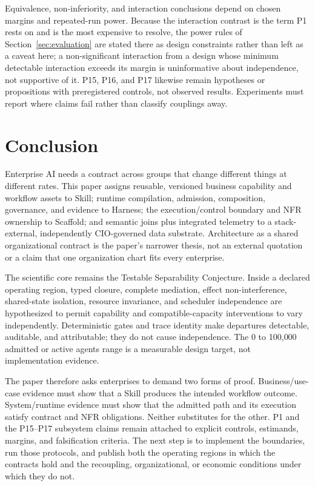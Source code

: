 Equivalence, non-inferiority, and interaction conclusions depend on chosen margins and repeated-run power. Because the interaction contrast is the term P1 rests on and is the most expensive to resolve, the power rules of Section~\ref{sec:evaluation} are stated there as design constraints rather than left as a caveat here; a non-significant interaction from a design whose minimum detectable interaction exceeds its margin is uninformative about independence, not supportive of it. P15, P16, and P17 likewise remain hypotheses or propositions with preregistered controls, not observed results. Experiments must report where claims fail rather than classify couplings away.

\section{Conclusion}
\label{sec:conclusion}

Enterprise AI needs a contract across groups that change different things at different rates. This paper assigns reusable, versioned business capability and workflow assets to Skill; runtime compilation, admission, composition, governance, and evidence to Harness; the execution/control boundary and NFR ownership to Scaffold; and semantic joins plus integrated telemetry to a stack-external, independently CIO-governed data substrate. Architecture as a shared organizational contract is the paper's narrower thesis, not an external quotation or a claim that one organization chart fits every enterprise.

The scientific core remains the Testable Separability Conjecture. Inside a declared operating region, typed closure, complete mediation, effect non-interference, shared-state isolation, resource invariance, and scheduler independence are hypothesized to permit capability and compatible-capacity interventions to vary independently. Deterministic gates and trace identity make departures detectable, auditable, and attributable; they do not cause independence. The 0 to 100{,}000 admitted or active agents range is a measurable design target, not implementation evidence.

The paper therefore asks enterprises to demand two forms of proof. Business/use-case evidence must show that a Skill produces the intended workflow outcome. System/runtime evidence must show that the admitted path and its execution satisfy contract and NFR obligations. Neither substitutes for the other. P1 and the P15--P17 subsystem claims remain attached to explicit controls, estimands, margins, and falsification criteria. The next step is to implement the boundaries, run those protocols, and publish both the operating regions in which the contracts hold and the recoupling, organizational, or economic conditions under which they do not.





